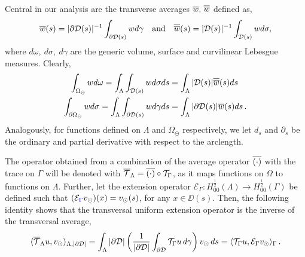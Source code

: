 \documentclass[r]{siamart171218}
\newcommand{\miro}[1]{{\color{blue}#1}}
\begin{document}
Central in our analysis are the transverse averages $\overline{w},\,\overline{\overline{w}}$ defined as, 
\begin{gather*}
\overline{w}(s) = |\partial\mathcal{D}(s)|^{-1} \int_{\partial\mathcal{D}(s)} w d\gamma \quad \mbox{and} \quad 
\overline{\overline{w}}(s) = |\mathcal{D}(s)|^{-1} \int_{\mathcal{D}(s)} w d\sigma, 
\end{gather*}
where $d\omega, \ d\sigma, \ d\gamma$ are the generic volume, surface and curvilinear Lebesgue measures.
Clearly, 
\begin{gather*}
\int_{\Omega_{\ominus}} w d\omega 
= \int_\Lambda \int_{\mathcal{D}(s)} w d\sigma ds
= \int_\Lambda |\mathcal{D}(s)|\overline{\overline{w}}(s) ds\, 
\\
\int_{\partial\Omega_{\ominus}} w d\sigma 
= \int_\Lambda \int_{\partial\mathcal{D}(s)} w d\gamma ds
= \int_\Lambda  |\partial \mathcal{D}(s)| \overline{w}(s) ds\,. 
\end{gather*}
Analogously, for functions defined on $\Lambda$ and $\Omega_\ominus$ respectively, 
we let  $d_s$ and $\partial_s$ be the ordinary and partial derivative with respect to the arclength.

The operator obtained from a combination of the average operator $\overline{(\cdot)}$ with the trace on $\Gamma$ will be denoted with ${\overline{\mathcal{T}}_\Lambda} = \overline{(\cdot)} \circ {\mathcal{T}_\Gamma}$, as it maps functions on $\Omega$ to functions on $\Lambda$.
Further, let the extension operator $\mathcal{E}_{\Gamma}: H^{\frac 1 2}_{00}(\Lambda) \rightarrow H^{\frac 1 2}_{00}(\Gamma)$ be defined such that $(\mathcal{E}_{\miro{\Gamma}}\vd)(x)=\vd(s)$, for any $x\in \DD(s)$. Then, the following identity shows that the transversal uniform extension operator is the inverse of the transversal average,
\begin{equation}\label{eq:ext}
\langle \mtrace u, \vd \rangle_{\Lambda, |\DD|} 
= \int _{\Lambda} |\DD| \left( \frac{1}{|\DD|} \int_{\DD} \trace u \, d\gamma \right) \vd \, ds 
= \langle \trace u, \ext \vd\rangle_{\Gamma}\,.
\end{equation}

\end{document}
